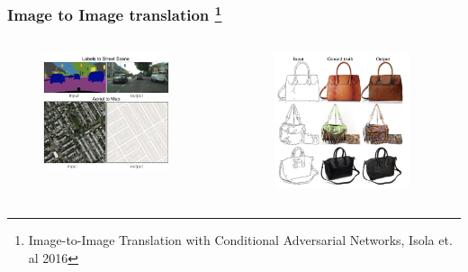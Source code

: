 \documentclass{beamer}
\begin{document}
\begin{frame}
    \frametitle{Image to Image translation \footnote{Image-to-Image Translation 
    with Conditional Adversarial Networks, Isola et. al 2016}}
    \begin{columns}
            \begin{center}
                \begin{figure}
                    \includegraphics[width=0.9\textwidth]{images/img2img2.png}
                \end{figure}
            \end{center}
            \begin{center}
                \begin{figure}
                    \includegraphics[width=0.9\textwidth]{images/img1img1.png}
                \end{figure}
            \end{center}            
    \end{columns}
\end{frame}
\end{document}
